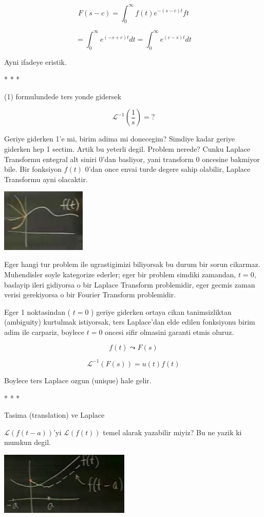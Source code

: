 \documentclass[12pt,fleqn]{article}\usepackage{../common}
\begin{document}
\[ F(s-c) = \int _{0}^{\infty} f(t) e^{-(s-c)t} ft  \]

\[ = \int _{0}^{\infty} e^{(-s+c)t} dt  = \int _{0}^{\infty} e^{(c-s)t} dt   \]

Ayni ifadeye eristik. 

* * *

(1) formulundede ters yonde gidersek

\[ \mathcal{L}^{-1}(\frac{1}{s}) = ?  \]

Geriye giderken 1'e mi, birim adima mi donecegim? Simdiye kadar geriye
giderken hep 1 sectim. Artik bu yeterli degil. Problem nerede? Cunku
Laplace Transformu entegral alt siniri 0'dan basliyor, yani transform 0
oncesine bakmiyor bile. Bir fonksiyon $f(t)$ 0'dan once envai turde degere
sahip olabilir, Laplace Transformu ayni olacaktir. 

\includegraphics[height=3cm]{22_6.png}

Eger hangi tur problem ile ugrastigimizi biliyorsak bu durum bir sorun
cikarmaz. Muhendisler soyle kategorize ederler; eger bir problem simdiki
zamandan, $t=0$, baslayip ileri gidiyorsa o bir Laplace Transform
problemidir, eger gecmis zaman verisi gerekiyorsa o bir Fourier Transform
problemidir. 

Eger 1 noktasindan ( $t=0$ ) geriye giderken ortaya cikan tanimsizliktan
(ambiguity) kurtulmak istiyorsak, ters Laplace'dan elde edilen fonksiyonu
birim adim ile carpariz, boylece $t=0$ oncesi sifir olmasini garanti etmis
oluruz.

\[ f(t) \leadsto F(s) \]

\[ \mathcal{L}^{-1}(F(s)) = u(t)f(t) \]

Boylece ters Laplace ozgun (unique) hale gelir.

* * * 

Tasima (translation) ve Laplace 

$\mathcal{L}(f(t-a))$'yi $\mathcal{L}(f(t))$ temel alarak yazabilir miyiz?
Bu ne yazik ki mumkun degil. 

\includegraphics[height=3cm]{22_7.png}
\end{document}
